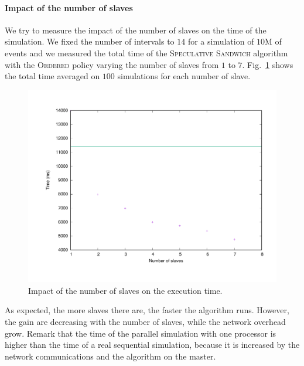 \documentclass[a4paper,10pt]{article}
\begin{document}
    \paragraph{Impact of the number of slaves}
    
 We try to measure the impact of the number of slaves on the time of the simulation.
 We fixed the number of intervals to $14$ for a simulation of $10$M of events and we measured the total time of the  \textsc{Speculative Sandwich} algorithm with the \textsc{Ordered} policy varying the number of slaves from $1$ to $7$. Fig.~\ref{fig:nbservs} shows the total time averaged on $100$ simulations for each number of slave.
 
\begin{figure}[H]
\centering
\label{fig:nbservs}
 \includegraphics[scale=0.45]{numberofservers.pdf}
 \caption{Impact of the number of slaves on the execution time.}
\end{figure}
As expected, the more slaves there are, the faster the algorithm runs. However, the gain are decreasing with the number of slaves, 
while the network overhead grow. Remark that the time of the parallel simulation with one processor is higher than the time of a real sequential simulation, because it is increased by the network communications and the algorithm on the master.
%
\end{document}
